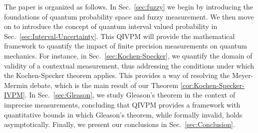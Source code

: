 \documentclass[english,reprint, aps, prl,superscriptaddress, showpacs,
showkeys, longbibliography, amsmath, amssymb]{revtex4-1}
\theoremstyle{plain}
\theoremstyle{definition}
\newcommand{\nb}{\nolinebreak[1] }
\begin{document}
The paper is organized as follows.   In Sec.\ \ref{sec:fuzzy} we begin by introducing the foundations of quantum probability space and fuzzy measurement.  We then move on to introduce the concept of quantum interval valued probability in Sec.\ \ref{sec:Interval-Uncertainty}.  This QIVPM will provide the mathematical framework to quantify the impact of finite precision measurements on quantum mechanics.  For instance, in Sec.\ \ref{sec:Kochen-Specker},  we quantify the domain of validity of a  contextual measurement, thus addressing the conditions under which the Kochen-Specker theorem applies.  This provides a way of resolving the Meyer-Mermin debate, which is the main result of our Theorem \ref{cor:Kochen-Specker-IVPM}.  In Sec.\ \ref{sec:Gleason}, we study Gleason's theorem in the context of imprecise measurements, concluding that QIVPM provides a framework with quantitative bounds in which Gleason's theorem, while formally invalid, holds asymptotically.  Finally, we present our conclusions in Sec.~\ref{sec:Conclusion}.


\end{document}
